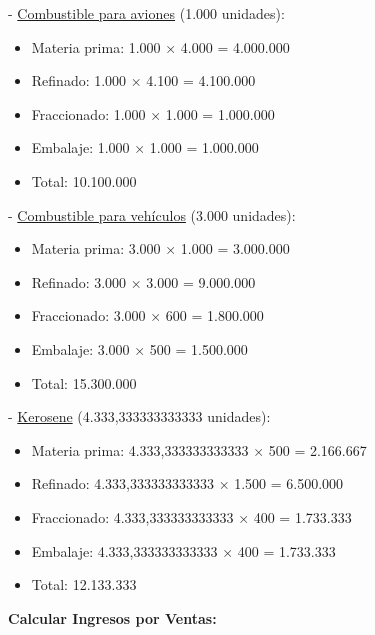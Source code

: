 \documentclass[10pt,a4paper]{article}
\begin{document}
\begin{enumerate}
    - \underline{Combustible para aviones} (1.000 unidades):

    \begin{itemize}

        \item Materia prima: 1.000 × 4.000 = 4.000.000
        \item Refinado: 1.000 × 4.100 = 4.100.000
        \item Fraccionado: 1.000 × 1.000 = 1.000.000
        \item Embalaje: 1.000 × 1.000 = 1.000.000 \\
        \item Total: 10.100.000

    \end{itemize}

    - \underline{Combustible para vehículos} (3.000 unidades):

    \begin{itemize}

        \item Materia prima: 3.000 × 1.000 = 3.000.000
        \item Refinado: 3.000 × 3.000 = 9.000.000
        \item Fraccionado: 3.000 × 600 = 1.800.000
        \item Embalaje: 3.000 × 500 = 1.500.000 \\
        \item Total: 15.300.000

    \end{itemize}
    \clearpage

    - \underline{Kerosene} (4.333,333333333333 unidades):

    \begin{itemize}

        \item Materia prima: 4.333,333333333333 × 500 = 2.166.667
        \item Refinado: 4.333,333333333333 × 1.500 = 6.500.000
        \item Fraccionado: 4.333,333333333333 × 400 = 1.733.333
        \item Embalaje: 4.333,333333333333 × 400 = 1.733.333 \\
        \item Total: 12.133.333\\

    \end{itemize}

    \textbf{Calcular Ingresos por Ventas:}


\end{enumerate}
\end{document}
